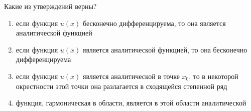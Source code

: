 Какие из утверждений верны?

\begin{enumerate}[label=\arabic*)]
    \item если функция \(u(x)\) бесконечно дифференцируема, то она является аналитической функцией
    \item если функция \(u(x)\) является аналитической функцией, то она бесконечно дифференцируема
    \item если функция \(u(x)\) является аналитической в точке \(x_0\), то в некоторой окрестности этой точки она разлагается в сходящейся степенной ряд
    \item функция, гармоническая в области, является в этой области аналитической
\end{enumerate}

